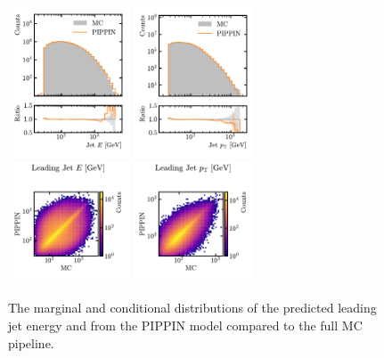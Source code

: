 \begin{figure}[htb]
    \centering
    \includegraphics[width=0.32\textwidth]{Figures/jet_generation/pippin/marginals/marginal_jet_energy.pdf}
    \includegraphics[width=0.32\textwidth]{Figures/jet_generation/pippin/marginals/marginal_jet_pt.pdf} \\
    \includegraphics[clip, trim=0cm 0cm 0cm 2.5cm, width=0.32\textwidth]{Figures/jet_generation/pippin/marginals_2D/marginal2D_jet_energy.pdf}
    \includegraphics[clip, trim=0cm 0cm 0cm 2.5cm, width=0.32\textwidth]{Figures/jet_generation/pippin/marginals_2D/marginal2D_jet_pt.pdf}
    \caption{
        The marginal and conditional distributions of the predicted leading jet energy and \pt from the PIPPIN model compared to the full MC pipeline.
    }
    \label{fig:pippin_jet}
\end{figure}

